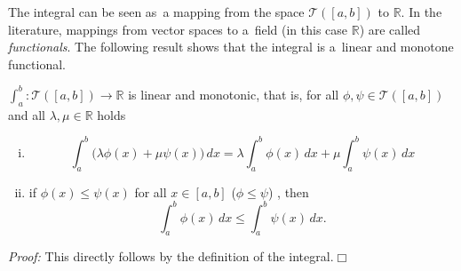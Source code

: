 

The integral can be seen as~a mapping from the space $\mathcal{T}([a,b])$ to $\mathbb{R}$. In the literature, 
mappings from vector spaces to a~field (in this case $\mathbb{R}$) are called \emph{functionals}. 
The following result shows that the integral is a~linear and monotone functional.
\begin{Theorem}{}
$\int_a^b:\mathcal{T}([a,b])\to\mathbb{R}$ is linear and monotonic, that is, for all $\phi,\psi\in\mathcal{T}([a,b])$ and all $\lambda,\mu\in\mathbb{R}$ holds
\begin{enumerate}[(i)]
\item \[\int_a^b
\Big(\lambda\phi(x)+\mu\psi(x)\Big)\, dx=\lambda\int_a^b\phi(x)\, dx+\mu\int_a^b\psi(x)\, dx\]
\item if $\phi(x)\leq\psi(x)$ for all $x\in[a,b]$ ($\phi\leq\psi$) , then
\[\int_a^b\phi(x)\, dx\leq\int_a^b\psi(x)\, dx.\]
\end{enumerate}
\end{Theorem}
{\em Proof:} This directly follows by the definition of the integral.\hfill$\Box$

